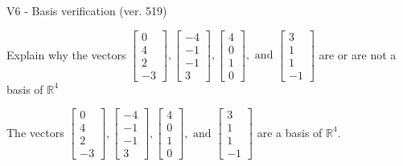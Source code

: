 \begin{exercise}
  \begin{exerciseTitle}V6 - Basis verification (ver. 519)\end{exerciseTitle}
  \begin{exerciseStatement}
    Explain why the vectors \(\left[\begin{array}{r}
0 \\
4 \\
2 \\
-3
\end{array}\right] , \left[\begin{array}{r}
-4 \\
-1 \\
-1 \\
3
\end{array}\right] , \left[\begin{array}{r}
4 \\
0 \\
1 \\
0
\end{array}\right] , \text{ and } \left[\begin{array}{r}
3 \\
1 \\
1 \\
-1
\end{array}\right]\) are or are not a basis of \(\mathbb{R}^4\)	


  \end{exerciseStatement}
  \begin{exerciseAnswer}
   The vectors \(\left[\begin{array}{r}
0 \\
4 \\
2 \\
-3
\end{array}\right] , \left[\begin{array}{r}
-4 \\
-1 \\
-1 \\
3
\end{array}\right] , \left[\begin{array}{r}
4 \\
0 \\
1 \\
0
\end{array}\right] , \text{ and } \left[\begin{array}{r}
3 \\
1 \\
1 \\
-1
\end{array}\right]\) 
  	 are  a basis of \(\mathbb{R}^4\).
  


  \end{exerciseAnswer}
\end{exercise}